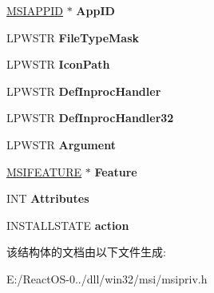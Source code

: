 \begin{DoxyCompactItemize}
\hyperlink{structtag_m_s_i_a_p_p_i_d}{M\+S\+I\+A\+P\+P\+ID} $\ast$ {\bfseries App\+ID}
\item 
\mbox{\label{structtag_m_s_i_c_l_a_s_s_a85ba08e8f102d31df35e96912624809a}} 
L\+P\+W\+S\+TR {\bfseries File\+Type\+Mask}
\item 
\mbox{\label{structtag_m_s_i_c_l_a_s_s_a27ac8d7f1d0dc4a44777b0b22b4bb9e9}} 
L\+P\+W\+S\+TR {\bfseries Icon\+Path}
\item 
\mbox{\label{structtag_m_s_i_c_l_a_s_s_a77985cc2988d2e81a209d8f65bf041ef}} 
L\+P\+W\+S\+TR {\bfseries Def\+Inproc\+Handler}
\item 
\mbox{\label{structtag_m_s_i_c_l_a_s_s_ac06501c191f984293215bbc6fb8c2d9a}} 
L\+P\+W\+S\+TR {\bfseries Def\+Inproc\+Handler32}
\item 
\mbox{\label{structtag_m_s_i_c_l_a_s_s_a402fe21b46247a05c7004b5900ec9df9}} 
L\+P\+W\+S\+TR {\bfseries Argument}
\item 
\mbox{\label{structtag_m_s_i_c_l_a_s_s_ae9bb3f5af7c8617a29096ce0f2f210d9}} 
\hyperlink{structtag_m_s_i_f_e_a_t_u_r_e}{M\+S\+I\+F\+E\+A\+T\+U\+RE} $\ast$ {\bfseries Feature}
\item 
\mbox{\label{structtag_m_s_i_c_l_a_s_s_a087dbae9c077e3eb585571a868a1e366}} 
I\+NT {\bfseries Attributes}
\item 
\mbox{\label{structtag_m_s_i_c_l_a_s_s_a525ab0a56026675eb16340c102f884c1}} 
I\+N\+S\+T\+A\+L\+L\+S\+T\+A\+TE {\bfseries action}
\end{DoxyCompactItemize}


该结构体的文档由以下文件生成\+:\begin{DoxyCompactItemize}
\item 
E\+:/\+React\+O\+S-\/0../dll/win32/msi/msipriv.\+h\end{DoxyCompactItemize}
